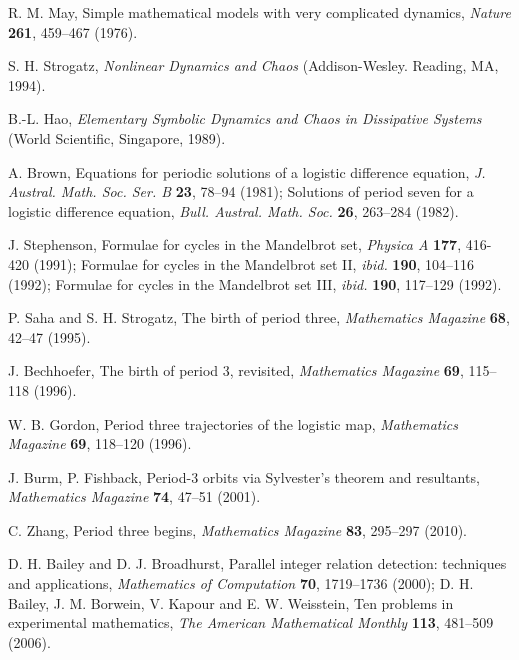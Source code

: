 \documentclass[twocolumn]{revtex4-1}
\begin{document}
\begin{thebibliography}{50}


  R. M. May,
  Simple mathematical models with very complicated dynamics,
  \textit{Nature}
  \textbf{261},
  459--467
  (1976).

  S. H. Strogatz,
  \textit{Nonlinear Dynamics and Chaos}
  (Addison-Wesley. Reading, MA, 1994).

 B.-L. Hao,
  \textit{Elementary Symbolic Dynamics and Chaos in  Dissipative Systems}
  (World Scientific, Singapore, 1989).

  A. Brown,
  Equations for periodic solutions of a logistic difference equation,
  \textit{J. Austral. Math. Soc. Ser. B}
  \textbf{23},
  78--94
  (1981);
  Solutions of period seven for a logistic difference equation,
  \textit{Bull. Austral. Math. Soc.}
  \textbf{26},
  263--284
  (1982).

  J. Stephenson,
  Formulae for cycles in the Mandelbrot set,
  \textit{Physica A}
  \textbf{177},
  416-420
  (1991);
  Formulae for cycles in the Mandelbrot set II,
  \textit{ibid.}
  \textbf{190},
  104--116
  (1992);
  Formulae for cycles in the Mandelbrot set III,
  \textit{ibid.}
  \textbf{190},
  117--129
  (1992).

  P. Saha and S. H. Strogatz,
  The birth of period three,
  \textit{Mathematics Magazine}
  \textbf{68},
  42--47
  (1995).

  J. Bechhoefer,
  The birth of period 3, revisited,
  \textit{Mathematics Magazine}
  \textbf{69},
  115--118
  (1996).

  W. B. Gordon,
  Period three trajectories of the logistic map,
  \textit{Mathematics Magazine}
  \textbf{69},
  118--120
  (1996).

  J. Burm, P. Fishback,
  Period-3 orbits via Sylvester's theorem and resultants,
  \textit{Mathematics Magazine}
  \textbf{74},
  47--51
  (2001).

  C. Zhang,
  Period three begins,
  \textit{Mathematics Magazine}
  \textbf{83},
  295--297
  (2010).

  D. H. Bailey and D. J. Broadhurst,
  Parallel integer relation detection: techniques and applications,
  \textit{Mathematics of Computation}
  \textbf{70},
  1719--1736
  (2000);
  D. H. Bailey, J. M. Borwein, V. Kapour and E. W. Weisstein,
  Ten problems in experimental mathematics,
  \textit{The American Mathematical Monthly}
  \textbf{113},
  481--509
  (2006).


\end{thebibliography}
\end{document}
